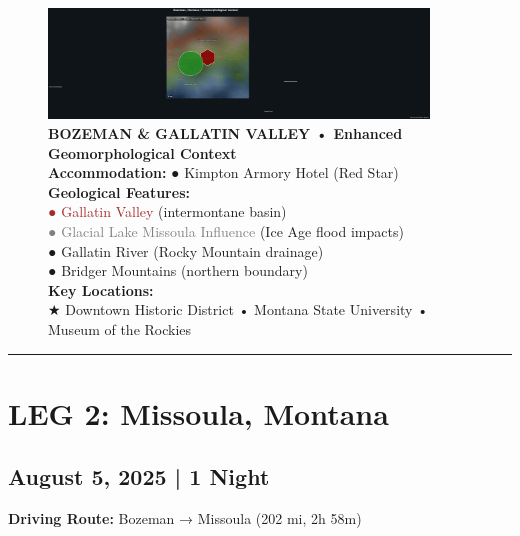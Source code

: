 \documentclass[
  11pt,
]{article}
\begin{document}
\begin{figure}[H]
\centering
\includegraphics[width=0.9\textwidth]{images/bozeman_mt_geomorphological_map.png}
\caption{\textbf{\textcolor{primary}{BOZEMAN \& GALLATIN VALLEY • Enhanced Geomorphological Context}} \\ 
\textbf{\textcolor{secondary}{Accommodation:}} \textcolor{mapred}{●} Kimpton Armory Hotel (Red Star) \\
\textbf{\textcolor{secondary}{Geological Features:}} \\
\textcolor{brown}{●} \textcolor{brown}{Gallatin Valley} (intermontane basin) \\
\textcolor{gray}{●} \textcolor{gray}{Glacial Lake Missoula Influence} (Ice Age flood impacts) \\
\textcolor{mapgreen}{●} \textcolor{mapgreen}{Gallatin River} (Rocky Mountain drainage) \\
\textcolor{mapblue}{●} \textcolor{mapblue}{Bridger Mountains} (northern boundary) \\
\textbf{\textcolor{secondary}{Key Locations:}} \\
\textcolor{mapred}{★} Downtown Historic District • Montana State University • Museum of the Rockies}
\end{figure}

\begin{center}\rule{0.5\linewidth}{0.5pt}\end{center}

\newpage

\section{\texorpdfstring{\textcolor{primary}{LEG 2: Missoula, Montana}}{}}\label{section-10}

\subsection{\texorpdfstring{\textcolor{secondary}{August 5, 2025 | 1 Night}}{}}\label{section-11}

\textbf{\textcolor{secondary}{Driving Route:}} Bozeman → Missoula (202
mi, 2h 58m)
\end{document}
